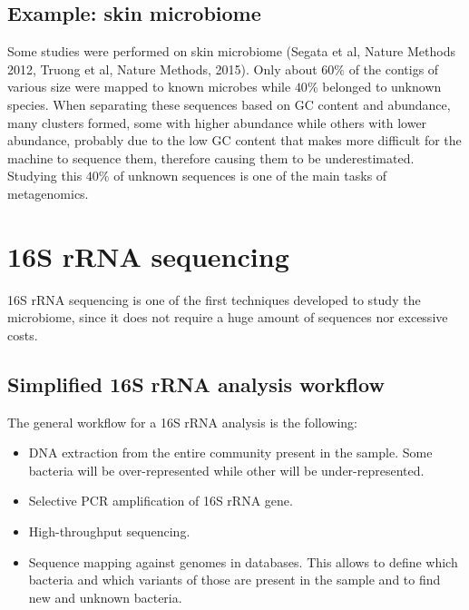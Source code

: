   \subsection{Example: skin microbiome}
  Some studies were performed on skin microbiome (Segata et al, Nature Methods 2012, Truong et al, Nature Methods, 2015).
  Only about $60\%$ of the contigs of various size were mapped to known microbes while $40\%$ belonged to unknown species.
  When separating these sequences based on GC content and abundance, many clusters formed, some with higher abundance while others with lower abundance, probably due to the low GC content that makes more difficult for the machine to sequence them, therefore causing them to be underestimated.
  Studying this $40\%$ of unknown sequences is one of the main tasks of metagenomics.

\section{16S rRNA sequencing}
16S rRNA sequencing is one of the first techniques developed to study the microbiome, since it does not require a huge amount of sequences nor excessive costs.

  \subsection{Simplified 16S rRNA analysis workflow}
    The general workflow for a 16S rRNA analysis is the following:

    \begin{multicols}{2}
      \begin{itemize}
        \item DNA extraction from the entire community present in the sample.
          Some bacteria will be over-represented while other will be under-represented.
        \item Selective PCR amplification of 16S rRNA gene.
        \item High-throughput sequencing.
        \item Sequence mapping against genomes in databases.
          This allows to define which bacteria and which variants of those are present in the sample and to find new and unknown bacteria.
      \end{itemize}
    \end{multicols}

